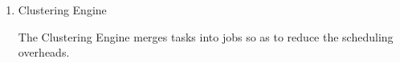 \begin{enumerate}

\item Clustering Engine

The Clustering Engine merges tasks into jobs so as to reduce the scheduling overheads. 


  






\end{enumerate}
